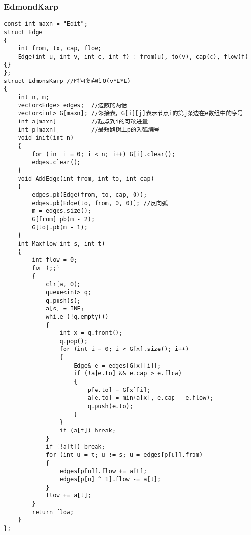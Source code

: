 \documentclass[a4]{article}
\begin{document}
\subsubsection{EdmondKarp}
\begin{lstlisting}
const int maxn = "Edit";
struct Edge
{
    int from, to, cap, flow;
    Edge(int u, int v, int c, int f) : from(u), to(v), cap(c), flow(f) {}
};
struct EdmonsKarp //时间复杂度O(v*E*E)
{
    int n, m;
    vector<Edge> edges;  //边数的两倍
    vector<int> G[maxn]; //邻接表，G[i][j]表示节点i的第j条边在e数组中的序号
    int a[maxn];         //起点到i的可改进量
    int p[maxn];         //最短路树上p的入弧编号
    void init(int n)
    {
        for (int i = 0; i < n; i++) G[i].clear();
        edges.clear();
    }
    void AddEdge(int from, int to, int cap)
    {
        edges.pb(Edge(from, to, cap, 0));
        edges.pb(Edge(to, from, 0, 0)); //反向弧
        m = edges.size();
        G[from].pb(m - 2);
        G[to].pb(m - 1);
    }
    int Maxflow(int s, int t)
    {
        int flow = 0;
        for (;;)
        {
            clr(a, 0);
            queue<int> q;
            q.push(s);
            a[s] = INF;
            while (!q.empty())
            {
                int x = q.front();
                q.pop();
                for (int i = 0; i < G[x].size(); i++)
                {
                    Edge& e = edges[G[x][i]];
                    if (!a[e.to] && e.cap > e.flow)
                    {
                        p[e.to] = G[x][i];
                        a[e.to] = min(a[x], e.cap - e.flow);
                        q.push(e.to);
                    }
                }
                if (a[t]) break;
            }
            if (!a[t]) break;
            for (int u = t; u != s; u = edges[p[u]].from)
            {
                edges[p[u]].flow += a[t];
                edges[p[u] ^ 1].flow -= a[t];
            }
            flow += a[t];
        }
        return flow;
    }
};
\end{lstlisting}
\end{document}
